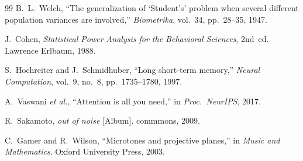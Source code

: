 \documentclass[conference,10pt,a4paper]{IEEEtran}
\begin{document}
\begin{thebibliography}{99}
B.~L.~Welch, ``The generalization of `Student's' problem when several
different population variances are involved,''
\emph{Biometrika}, vol.~34, pp.~28--35, 1947.

J.~Cohen, \emph{Statistical Power Analysis for the Behavioral Sciences},
2nd~ed. Lawrence Erlbaum, 1988.

S.~Hochreiter and J.~Schmidhuber, ``Long short-term memory,''
\emph{Neural Computation}, vol.~9, no.~8, pp.~1735--1780, 1997.

A.~Vaswani \emph{et al.}, ``Attention is all you need,'' in
\emph{Proc.\ NeurIPS}, 2017.

R.~Sakamoto, \emph{out of noise} [Album]. commmons, 2009.

C.~Gamer and R.~Wilson, ``Microtones and projective planes,'' in
\emph{Music and Mathematics}. Oxford University Press, 2003.

\end{thebibliography}
\end{document}
